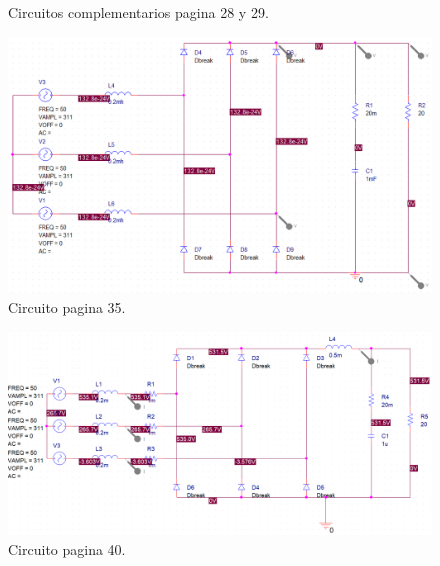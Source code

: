 \documentclass[letterpaper]{article}
\begin{document}
\begin{large}
\begin{figure}[htbp]
            \caption{Circuitos complementarios pagina 28 y 29.}
            \label{fig:cirp28y29}
        \end{figure}
        \begin{figure}[htbp]
            \centering
            \includegraphics[scale=0.5]{cirp35.png}
            \caption{Circuito pagina 35.}
            \label{fig:cirp35}
        \end{figure}
        \begin{figure}[htbp]
            \centering
            \includegraphics[scale=0.4]{cirp40.png}
            \caption{Circuito pagina 40.}
            \label{fig:cir40}
        \end{figure}
    \end{large}
    \newpage
    \vspace{1.2cm}
\end{document}
